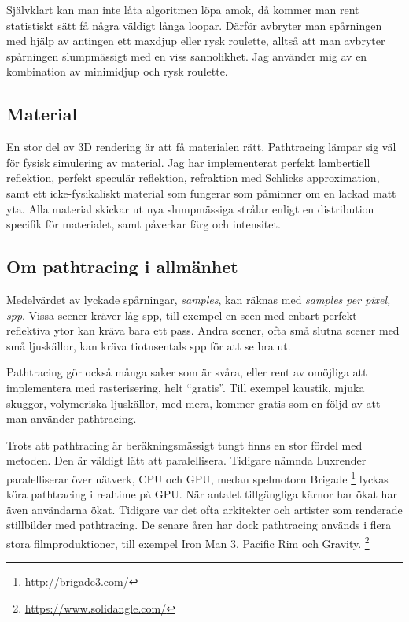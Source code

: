 \documentclass{article}
\begin{document}
Självklart kan man inte låta algoritmen löpa amok, då kommer man rent
statistiskt sätt få några väldigt långa loopar. Därför avbryter man
spårningen med hjälp av antingen ett maxdjup eller rysk roulette,
alltså att man avbryter spårningen slumpmässigt med en viss
sannolikhet. Jag använder mig av en kombination av minimidjup och rysk
roulette.

\subsection{Material}
En stor del av 3D rendering är att få materialen rätt. Pathtracing
lämpar sig väl för fysisk simulering av material. Jag har
implementerat perfekt lambertiell reflektion, perfekt speculär
reflektion, refraktion med Schlicks approximation, samt ett
icke-fysikaliskt material som fungerar som påminner om en lackad matt
yta. Alla material skickar ut nya slumpmässiga strålar enligt en
distribution specifik för materialet, samt påverkar färg och
intensitet.

\subsection{Om pathtracing i allmänhet}
Medelvärdet av lyckade spårningar, \emph{samples}, kan räknas med
\emph{samples per pixel, spp}. Vissa scener kräver låg spp, till
exempel en scen med enbart perfekt reflektiva ytor kan kräva bara ett
pass. Andra scener, ofta små slutna scener med små ljuskällor, kan
kräva tiotusentals spp för att se bra ut.

Pathtracing gör också många saker som är svåra, eller rent av omöjliga
att implementera med rasterisering, helt ``gratis''. Till exempel
kaustik, mjuka skuggor, volymeriska ljuskällor, med mera, kommer
gratis som en följd av att man använder pathtracing.

Trots att pathtracing är beräkningsmässigt tungt finns en stor fördel
med metoden. Den är väldigt lätt att paralellisera. Tidigare nämnda
Luxrender paralelliserar över nätverk, CPU och GPU, medan spelmotorn Brigade
\footnote{\url{http://brigade3.com/}} lyckas köra pathtracing i
realtime på GPU. När antalet tillgängliga kärnor har ökat har även
användarna ökat. Tidigare var det ofta arkitekter och artister som
renderade stillbilder med pathtracing. De senare åren har dock
pathtracing används i flera stora filmproduktioner, till exempel Iron
Man 3, Pacific Rim och Gravity. \footnote{\url{https://www.solidangle.com/}}
\end{document}
